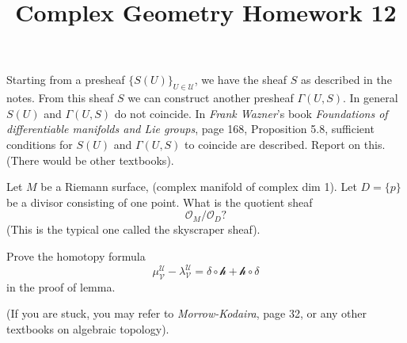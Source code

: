 \documentclass[12pt]{article}
\title{Complex Geometry Homework 12}
\author{}
\date{}
\begin{document}
\maketitle
\begin{problem}
  Starting from a presheaf \(\{S(U)\}_{U\in \mathcal{U}}\), we have the sheaf \(S\)
  as described in the notes. From this sheaf \(S\) we can construct another presheaf
  \(\Gamma(U,S)\). In general \(S(U)\) and \(\Gamma(U,S)\) do not coincide. In
  \emph{Frank Wazner}'s book \emph{Foundations of differentiable manifolds and Lie
  groups}, page 168, Proposition 5.8, sufficient conditions for \(S(U)\) and 
  \(\Gamma(U,S)\) to coincide are described. Report on this. (There would be other
  textbooks).
\end{problem}
\begin{problem}
  Let \(M\) be a Riemann surface, (complex manifold of complex dim 1). Let \(D=\{p\}\)
  be a divisor consisting of one point. What is the quotient sheaf \[
    \mathcal{O}_M/\mathcal{O}_D
  ?\] (This is the typical one called the skyscraper sheaf).
\end{problem}
\begin{problem}
  Prove the homotopy formula \[
    \mu_{\mathcal{V}}^{\mathcal{U}}-\lambda_{\mathcal{V}}^{\mathcal{U}}=\delta\circ 
    \mathcal{h}+\mathcal{h}\circ \delta
  \] in the proof of lemma.

  (If you are stuck, you may refer to \emph{Morrow-Kodaira}, page 32, or any other
  textbooks on algebraic topology).
\end{problem}
\end{document}
